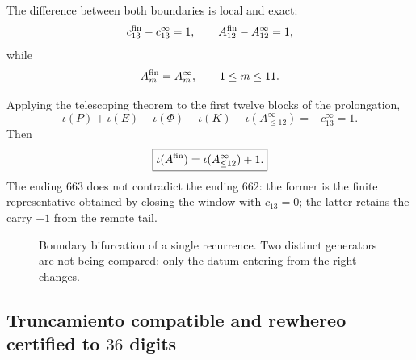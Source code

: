 The difference between both boundaries is local and exact:
\[
 c_{13}^{\rm fin}-c_{13}^{\infty}=1,
 \qquad
 A_{12}^{\rm fin}-A_{12}^{\infty}=1,
\]
while
\[
 A_m^{\rm fin}=A_m^\infty,
 \qquad 1\leq m\leq11.
\]

Applying the telescoping theorem to the first twelve blocks of the
prolongation,
\[
 \iota(P)+\iota(E)-\iota(\Phi)-\iota(K)
 -\iota(A^\infty_{\leq12})
 =-c_{13}^{\infty}=1.
\]
Then
\begin{equation}
 \boxed{
 \iota(A^{\rm fin})
 =\iota(A^\infty_{\leq12})+1.}
 \label{p3-83-c25-s5:eq:relacion-unidad-fronteras-alpha}
\end{equation}
The ending \(663\) does not contradict the ending \(662\): the former
is the finite representative obtained by closing the window with
\(c_{13}=0\); the latter retains the carry \(-1\) from the remote
tail.

\begin{figure}[htbp]
\centering
{}
\caption{Boundary bifurcation of a single recurrence. Two distinct generators
are not being compared: only the datum entering from the
right changes.}
\label{p3-83-c25-s5:fig:bifurcacion-frontera-alpha}
\end{figure}

\subsection{Truncamiento compatible and rewhereo certified to \(36\) digits}

